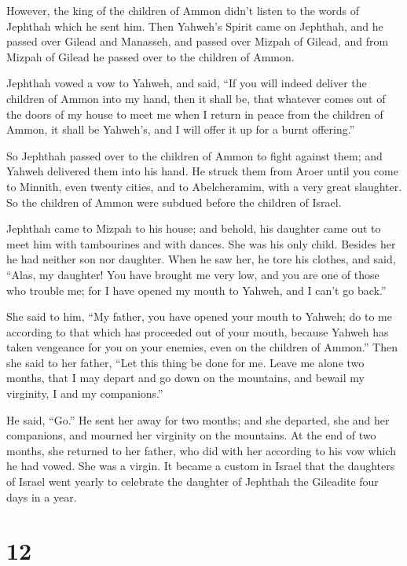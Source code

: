 However, the king of the children of Ammon didn't listen
to the words of Jephthah which he sent him.  Then
Yahweh's Spirit came on Jephthah, and he passed over Gilead and
Manasseh, and passed over Mizpah of Gilead, and from Mizpah of Gilead he
passed over to the children of Ammon.

 Jephthah vowed a vow to Yahweh, and said, ``If you will
indeed deliver the children of Ammon into my hand,  then
it shall be, that whatever comes out of the doors of my house to meet me
when I return in peace from the children of Ammon, it shall be Yahweh's,
and I will offer it up for a burnt offering.''

 So Jephthah passed over to the children of Ammon to
fight against them; and Yahweh delivered them into his hand.
 He struck them from Aroer until you come to Minnith,
even twenty cities, and to Abelcheramim, with a very great slaughter. So
the children of Ammon were subdued before the children of Israel.

 Jephthah came to Mizpah to his house; and behold, his
daughter came out to meet him with tambourines and with dances. She was
his only child. Besides her he had neither son nor daughter.
 When he saw her, he tore his clothes, and said, ``Alas,
my daughter! You have brought me very low, and you are one of those who
trouble me; for I have opened my mouth to Yahweh, and I can't go back.''

 She said to him, ``My father, you have opened your mouth
to Yahweh; do to me according to that which has proceeded out of your
mouth, because Yahweh has taken vengeance for you on your enemies, even
on the children of Ammon.''  Then she said to her father,
``Let this thing be done for me. Leave me alone two months, that I may
depart and go down on the mountains, and bewail my virginity, I and my
companions.''

 He said, ``Go.'' He sent her away for two months; and
she departed, she and her companions, and mourned her virginity on the
mountains.  At the end of two months, she returned to her
father, who did with her according to his vow which he had vowed. She
was a virgin. It became a custom in Israel  that the
daughters of Israel went yearly to celebrate the daughter of Jephthah
the Gileadite four days in a year.

\hypertarget{section-11}{%
\section{12}\label{section-11}}

